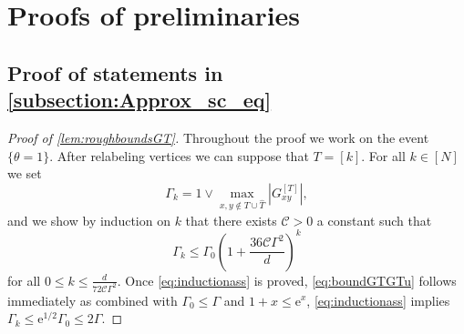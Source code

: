 \documentclass[10pt,a4paper]{amsart}
\newcommand{\abs}[1]{\left| #1 \right|}
\numberwithin{equation}{section}
\newcommand*\bset[1]{[#1]}
\newcommand*\ubarr[1]{{\widehat{#1}}}
\begin{document}
	
	\section{Proofs of preliminaries} 
	
	\subsection{Proof of statements in \cref{subsection:Approx_sc_eq} }\label{subsection:proofs_approx_sc}
		\begin{proof}[Proof of \cref{lem:roughboundsGT}]
		Throughout the proof we work on the event $\{\theta =1\}$. After relabeling vertices we can suppose that $T= [k]$. For all $k \in [N]$ we set 
		$$\Gamma_k = 1 \vee  \max_{x,y \notin T \cup \ubarr{T}} \abs{G^{\bset{T}}_{xy}}, $$
		and we show by induction on $k$ that there exists $\mathcal{C} >0 $ a constant such that
		\begin{equation}\label{eq:inductionass}
			\Gamma_k \le \Gamma_0 \left( 1 + \frac{ 36 \mathcal{C}\Gamma^2}{d}\right)^k
		\end{equation}
		for all $0 \le k \le \frac{d}{ 72 \mathcal{C}\Gamma^2}$. 
		Once \cref{eq:inductionass} is proved, \cref{eq:boundGTGTu} follows immediately as combined with $\Gamma_0 \le \Gamma$ and $1+ x \le \mathrm{e}^x$, \cref{eq:inductionass} implies $\Gamma_k \le \mathrm{e}^{1/2} \Gamma_0 \le 2 \Gamma$.
		

\end{proof}
\end{document}

